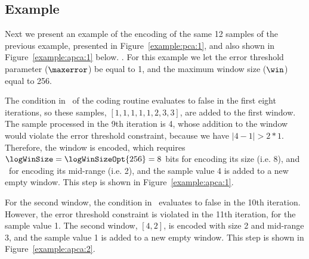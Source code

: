 




\subsection{Example}
\label{algo:apca:example}
\newcommand{\APCACodeOne}{4}
\newcommand{\APCACodeTwo}{11}
\newcommand{\exampleIntroFirst}[1]{Next we present an example of the encoding of the same 12 samples of previous examples, presented in Figure~\ref{example:pca:1}, and also shown in Figure~#1 below}


Next we present an example of the encoding of the same 12 samples of the previous example, presented in Figure~\ref{example:pca:1}, and also shown in Figure~\ref{example:apca:1} below. . For this example we let the error threshold parameter ($\maxerror$) be equal to 1, and the maximum window size ($\win$) equal to 256. 


The condition in \Line \APCACodeOne\ of the coding routine evaluates to false in the first eight iterations, so these samples, $[1, 1, 1, 1, 1, 2, 3, 3]$, are added to the first window. The sample processed in the 9th iteration is 4, whose addition to the window would violate the error threshold constraint, because we have $|4 - 1| > 2*1$. Therefore, the window is encoded, which requires $\logWinSize = \logWinSizeOpt{256}=8$ bits for encoding its size (i.e. 8), and \tobitexp\ for encoding its mid-range (i.e. 2), and the sample value 4 is added to a new empty window. This step is shown in Figure~\ref{example:apca:1}.




\clearpage


For the second window, the condition in \Line \APCACodeOne\ evaluates to false in the 10th iteration. However, the error threshold constraint is violated in the 11th iteration, for the sample value 1. The second window, $[4, 2]$, is encoded with size 2 and mid-range 3, and the sample value 1 is added to a new empty window. This step is shown in Figure~\ref{example:apca:2}.


\vspace{+5pt}


